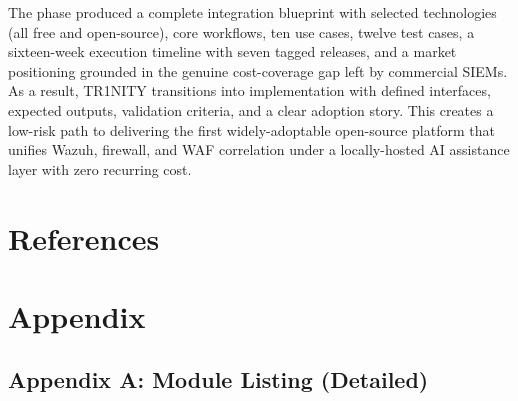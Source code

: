 \documentclass[11pt,a4paper]{article}
\begin{document}
The phase produced a complete integration blueprint with selected technologies (all free and open-source), core workflows, ten use cases, twelve test cases, a sixteen-week execution timeline with seven tagged releases, and a market positioning grounded in the genuine cost-coverage gap left by commercial SIEMs. As a result, TR1NITY transitions into implementation with defined interfaces, expected outputs, validation criteria, and a clear adoption story. This creates a low-risk path to delivering the first widely-adoptable open-source platform that unifies Wazuh, firewall, and WAF correlation under a locally-hosted AI assistance layer with zero recurring cost.

\newpage
\section{References}
\label{sec:refs}
\printbibliography[heading=none]

\newpage
\section{Appendix}
\label{sec:appendix}

\subsection{Appendix A: Module Listing (Detailed)}
\end{document}
